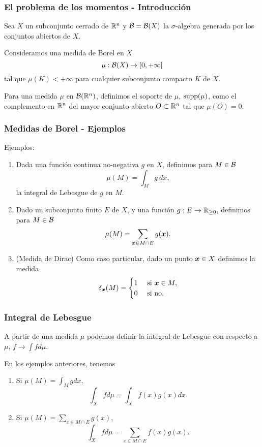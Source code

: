 \documentclass[aspectratio=169,12pt,spanish]{beamer}
\begin{document}
\begin{frame}

\frametitle{El problema de los momentos - Introducción}

Sea $X$ un subconjunto cerrado de $\mathbb{R}^n$ y ${\mathcal B} = {\mathcal B}(X)$ la $\sigma$-algebra generada por los conjuntos abiertos de $X$.

Consideramos una medida de Borel en $X$
$$
\mu: {\mathcal B}(X) \rightarrow [0, +\infty]
$$
tal que $\mu(K) < +\infty$ para cualquier subconjunto compacto $K$ de $X$.

Para una medida $\mu$ en ${\mathcal B}(\mathbb{R}^n)$, definimos el soporte de $\mu$, $\operatorname{supp}(\mu)$, como el complemento en $\mathbb{R}^n$ del mayor conjunto abierto $O \subset \mathbb{R}^n$ tal que $\mu(O) = 0$.

\end{frame}


\begin{frame}

\frametitle{Medidas de Borel - Ejemplos}

Ejemplos:
\begin{enumerate}
\item Dada una función continua no-negativa $g$ en $X$, definimos para $M \in {\mathcal B}$
$$\mu(M) = \int_M g \ dx,$$
la integral de Lebesgue de $g$ en $M$.
\item Dado un subconjunto finito $E$ de $X$, y una función $g: E \rightarrow \mathbb{R}_{\ge 0}$, definimos para $M \in {\mathcal B}$
$$
\mu(M) = \sum_{\bm{x} \in M \cap E} g(\bm{x}).
$$
\item (Medida de Dirac) Como caso particular, dado un punto $\bm{x} \in X$ definimos la medida
$$\delta_{\bm{x}}(M) = \begin{cases}
1 & \text{ si } \bm{x} \in M, \\
0 & \text{ si no. }
\end{cases}
$$
\end{enumerate}

\end{frame}


\begin{frame}

\frametitle{Integral de Lebesgue}

A partir de una medida $\mu$ podemos definir la integral de Lebesgue con respecto a $\mu$, $f \rightarrow \int f d\mu$.

En los ejemplos anteriores, tenemos
\begin{enumerate}
\item Si $\mu(M) = \int_M g dx$,
$$\int_X f d\mu = \int_X f(x) g(x) dx.$$
\item Si $\mu(M) = \sum_{x \in M \cap E} g(x)$,
$$\int_X f d\mu = \sum_{x \in M \cap E} f(x) g(x).$$
\end{enumerate}

\end{frame}
\end{document}
